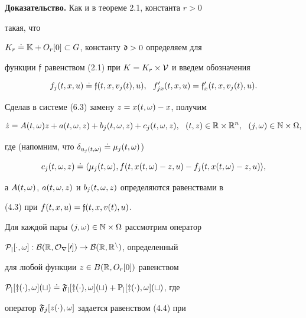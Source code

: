{\bf Доказательство.} Как и в теореме 2.1, константа $r>0$


такая, что


$K_{r}\doteq\Bbb K+O_{r}[0]\subset G$, константу $\frak d>0$ определяем для


функции $\frak f$ равенством (2.1) при $K=K_{r}\times\cal V$ и введем обозначения


\begin{equation}


f_{j}(t,x,u)\doteq{\gf}(t,x,v_{j}(t),u),


\ \ f'_{jx}(t,x,u)={\gf}'_{x}(t,x,v_{j}(t),u).


\end{equation}


Сделав в системе (6.3) замену $z=x(t,\omega)-x$, получим


\begin{equation}


\Dot z=A(t,\om)z+a(t,\om,z)+b_{j}(t,\om,z)+c_{j}(t,\om,z),


\ \ (t,z)\in\R\times\R^{n},


\ \ (j,\om)\in\Bbb N\times\Om,


\end{equation}


где (напомним, что $\delta_{u_{j}(t,\omega)}\doteq\mu_{j}(t,\omega)$)


\begin{equation}


c_{j}(t,\om,z)\doteq\la\mu_{j}(t,\om),f(t,x(t,\om)-z,u)


-f_{j}(t,x(t,\om)-z,u)\ra,


\end{equation}


а $A(t,\omega)$, $a(t,\omega,z)$ и $b_{j}(t,\omega,z)$ определяются равенствами в


(4.3) при $f(t,x,u)={\frak f}(t,x,v(t),u)$.





Для каждой пары $(j,\omega)\in\Bbb N\times\Omega$ рассмотрим оператор


$\cal P_{j}[\cdot,\omega]: B(\Bbb R,O_{r}[0])\to B(\Bbb R,\Bbb R^{n})$, определенный


для любой функции $z\in B(\Bbb R,O_{r}[0])$ равенством


$\cal P_{j}[z(\cdot),\om](t)\doteq\frak F_{j}[z(\cdot),\om](t)+


\Bbb P_{j}[z(\cdot),\om](t)$, где 


оператор $\frak F_{j}[z(\cdot),\omega]$ задается равенством (4.4) при


